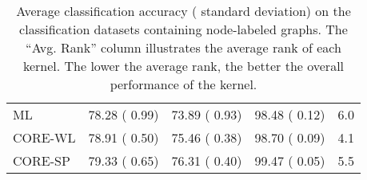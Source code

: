 \documentclass[twoside,11pt]{article}
\begin{document}
\begin{table}[t]
\begin{sc}
\begin{tabular}{lccc m{1.7cm}}
ML & 78.28 {\tiny ( 0.99)} & 73.89 {\tiny ( 0.93)} & 98.48 {\tiny ( 0.12)} & \multicolumn{1}{c}{6.0} \\
CORE-WL & 78.91 {\tiny ( 0.50)} & 75.46 {\tiny ( 0.38)} & 98.70 {\tiny ( 0.09)} & \multicolumn{1}{c}{4.1} \\
CORE-SP & 79.33 {\tiny ( 0.65)} & 76.31 {\tiny ( 0.40)} & 99.47 {\tiny ( 0.05)} & \multicolumn{1}{c}{5.5} \\ \hline
\end{tabular}
\end{sc}
\caption{Average classification accuracy ( standard deviation) on the  classification datasets containing node-labeled graphs. The ``Avg. Rank'' column illustrates the average rank of each kernel. The lower the average rank, the better the overall performance of the kernel.}
\label{tab:results_labeled}
\end{table}
\end{document}
